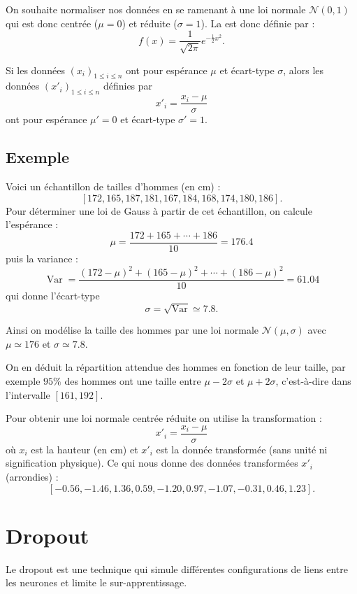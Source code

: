 \documentclass[11pt,class=report,crop=false]{standalone}
\begin{document}
On souhaite normaliser nos données en se ramenant à une loi normale $\mathcal{N}(0,1)$ qui est donc centrée ($\mu=0$) et réduite ($\sigma=1$). 
La  est donc définie par :
$$f(x) = \frac{1}{\sqrt{2\pi}} e^{-\frac12 x^2}.$$



Si les données $(x_i)_{1\le i \le n}$ ont pour espérance $\mu$ et écart-type $\sigma$,
alors les données $(x'_i)_{1\le i \le n}$ définies par 
$$x'_i = \frac{x_i-\mu}{\sigma}$$
ont pour espérance $\mu'=0$ et écart-type $\sigma'=1$.

\subsection{Exemple}
Voici un échantillon de tailles d'hommes (en cm) :
$$[172,165,187,181,167,184,168,174,180,186].$$
Pour déterminer une loi de Gauss à partir de cet échantillon, on calcule l'espérance :
$$\mu = \frac{172 + 165 + \cdots + 186}{10} = 176.4$$
puis la variance : 
$$\operatorname{Var} = \frac{(172-\mu)^2+(165-\mu)^2+\cdots + (186-\mu)^2}{10} = 61.04$$
qui donne l'écart-type
$$\sigma = \sqrt{\operatorname{Var}} \simeq 7.8.$$


Ainsi on modélise la taille des hommes par une loi normale $\mathcal{N}(\mu,\sigma)$
avec $\mu\simeq 176$ et $\sigma\simeq 7.8$.



On en déduit la répartition attendue des hommes en fonction de leur taille, par exemple 
$95\%$ des hommes ont une taille entre $\mu-2\sigma$ et $\mu+2\sigma$, c'est-à-dire dans l'intervalle $[161,192]$.

Pour obtenir une loi normale centrée réduite on utilise la transformation :
$$x'_i = \frac{x_i-\mu}{\sigma}$$
où $x_i$ est la hauteur (en cm) et $x'_i$ est la donnée transformée (sans unité ni signification physique).
Ce qui nous donne des données transformées $x'_i$ (arrondies) :
$$[-0.56, -1.46, 1.36,  0.59, -1.20,  0.97,  -1.07, -0.31, 0.46, 1.23].$$


\section{Dropout}

Le dropout est une technique qui simule différentes configurations de liens entre les neurones et limite le sur-apprentissage.
\end{document}
